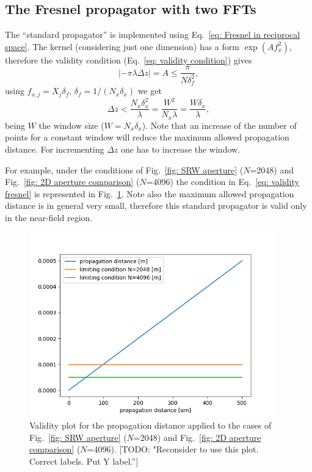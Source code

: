 \documentclass{iucr}              %
\newcommand{\todo}[1]{{\color{red}[TODO: "#1'']}}
\newcommand{\inred}[1]{{\color{red}#1}}
\begin{document}
\subsection{The Fresnel propagator with two FFTs}
The ``standard propagator'' is implemented using Eq.~\ref{eq: Fresnel in reciprocal space}. The kernel (considering just one dimension) has a form $\exp(A f_x^2)$, therefore the validity condition (Eq.~\ref{eq: validity condition}) gives
\begin{equation}
    |-\pi \lambda \Delta z | = A \le \frac{\pi}{N \delta_f^2},
\end{equation}
using $f_{x,j}=X_j \delta_f$, $\delta_f = 1/(N_x \delta_x)$ we get
\begin{equation}\label{eq: validity fresnel}
    \Delta z < \frac{N_x \delta_x^2}{\lambda}  = \frac{W^2}{N_x \lambda} = \frac{W \delta_x}{\lambda},
\end{equation}
being $W$ the window size ($W=N_x \delta_x$). Note that an increase of the number of points for a constant window will \inred{reduce} the maximum allowed propagation distance. For incrementing $\Delta z$ one has to increase the window. 


For example, under the conditions of Fig.~\ref{fig: SRW aperture} ($N$=2048) and Fig.~\ref{fig: 2D aperture comparison} ($N$=4096) the condition in Eq.~\ref{eq: validity fresnel} is represented in Fig.~\ref{fig: validity fresnel}. Note also the maximum allowed propagation distance is in general very small, therefore this standard propagator is valid only in the near-field region. 


\begin{figure}\label{fig: validity fresnel}
\caption{Validity plot for the propagation distance applied to the cases of Fig.~\ref{fig: SRW aperture} ($N$=2048) and Fig.~\ref{fig: 2D aperture comparison} ($N$=4096). \todo{Reconsider to use this plot. Correct labels. Put Y label.}
}
\includegraphics[width=0.95\textwidth]{fresnel_propagator_validity.png}
\end{figure}
\end{document}
